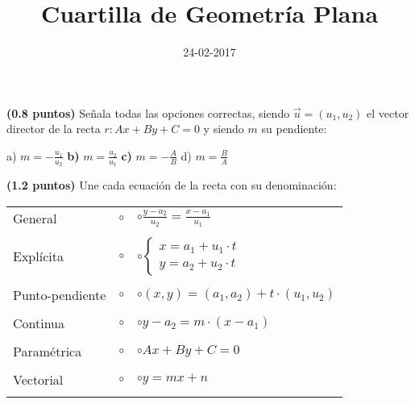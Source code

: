 \documentclass[palatino,noprobframes]{CuartillaSafa}
\title{Cuartilla de Geometría Plana}
\date{24-02-2017}
\renewcommand{\vec}[1]{\overrightarrow{#1}}
\begin{document}
\cabecera

\begin{problem}\textbf{(0.8 puntos)}
Señala todas las opciones correctas, siendo $\vec{u} = (u_1,u_2)$ el vector director de la recta $r: Ax+By+C = 0$ y siendo $m$ su pendiente:

a) $\displaystyle m=-\frac{u_1}{u_2}$\;\;\;\;\;\;\;\;\;
\textbf{b)} $\displaystyle m=\frac{u_2}{u_1}$\;\;\;\;\;\;\;\;\;
\textbf{c)} $\displaystyle m=-\frac{A}{B}$\;\;\;\;\;\;\;\;\;
d) $\displaystyle m=\frac{B}{A}$\;\;\;\;\;\;\;\;\;
\end{problem}


\begin{problem}\textbf{(1.2 puntos)} 
Une cada ecuación de la recta con su denominación:

\begin{tabular}{L{2.25cm}L{3cm}L{8cm}}
General 		&$\circ$&$\circ$\;\;$\displaystyle\frac{y-a_2}{u_2} = \frac{x-a_1}{u_1}$ \\\\
Explícita 		&$\circ$&$\circ$\;\;$\left\{\begin{array}{c} x=a_1+u_1·t\\y=a_2+u_2·t\end{array}\right.$ \\\\
Punto-pendiente &$\circ$&$\circ$\;\;$(x,y) = (a_1,a_2) + t·(u_1,u_2)$ \\\\
Continua 		&$\circ$&$\circ$\;\;$y-a_2 = m·(x-a_1)$ \\\\
Paramétrica 	&$\circ$&$\circ$\;\;$Ax+By+C=0$ \\\\
Vectorial 		&$\circ$&$\circ$\;\;$y=mx+n$ \\\\
\end{tabular}
\end{problem}
\vspace{-0.7cm}
\end{document}
